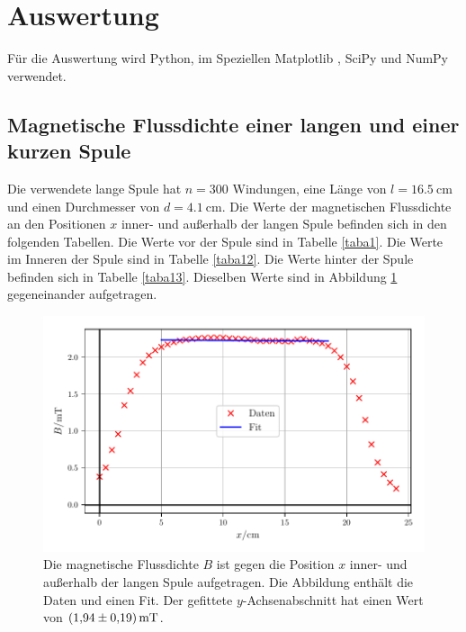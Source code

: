 \section{Auswertung}
\label{sec:Auswertung}

Für die Auswertung wird Python, im Speziellen Matplotlib \cite{matplotlib}, 
SciPy \cite{scipy} und NumPy \cite{numpy} verwendet.

\subsection{Magnetische Flussdichte einer langen und einer kurzen Spule}
Die verwendete lange Spule hat $n = \num{300}$ Windungen, eine Länge%
von $l = \SI{16.5}{\centi\meter}$ und einen Durchmesser von
$d = \SI{4.1}{\centi\meter}$.
Die Werte der magnetischen Flussdichte an den Positionen $x$ inner- und außerhalb
der langen Spule befinden sich in den folgenden Tabellen.
Die Werte vor der Spule sind in Tabelle \ref{taba1}. Die Werte im Inneren
der Spule sind in Tabelle \ref{taba12}. Die Werte hinter der Spule befinden
sich in Tabelle \ref{taba13}. %
Dieselben Werte sind in Abbildung \ref{plota1} gegeneinander aufgetragen.




\begin{figure}
    \centering
    \includegraphics{build/plota1.pdf}
    \caption{Die magnetische Flussdichte $B$ ist gegen die Position $x$ inner- 
    und außerhalb der langen Spule aufgetragen. Die Abbildung enthält die Daten
    und einen Fit. Der gefittete $y$-Achsenabschnitt hat einen Wert von
    $\SI{1.94 \pm 0.19}{\milli\tesla}$.} %
    \label{plota1}
\end{figure}


